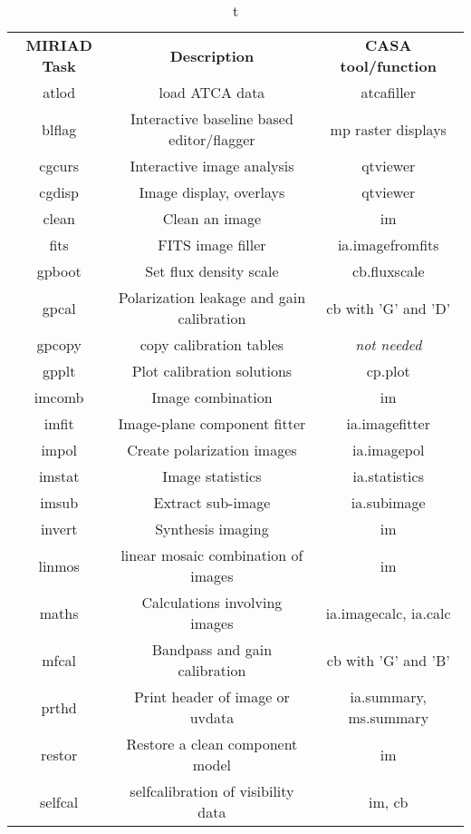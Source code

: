 \vspace{5mm}
\begin{table}[h!]
\caption[t]
        {\label{table:miriad}t}
\begin{center}
\begin{tabular}{|c|c|c|} \hline
{\bf MIRIAD Task} &  {\bf Description}     &  {\bf CASA tool/function}   \\
  atlod   &  load ATCA data                &  atcafiller   \\
  blflag  &  Interactive baseline based editor/flagger  &  mp raster displays\\
  cgcurs  &  Interactive image analysis    &  qtviewer \\ 
  cgdisp  &  Image display, overlays       &  qtviewer  \\
  clean   &  Clean an image                &  im   \\
  fits    &  FITS image filler             &  ia.imagefromfits \\  
  gpboot  &  Set flux density scale        &  cb.fluxscale   \\
  gpcal   &  Polarization leakage and gain calibration  &  cb with 'G' and 'D'  \\
  gpcopy  &  copy calibration tables       &   {\it not needed} \\
  gpplt   &  Plot calibration solutions    &  cp.plot  \\
  imcomb  &  Image combination             &  im   \\
  imfit   &  Image-plane component fitter  &  ia.imagefitter  \\
  impol   &  Create polarization images    &  ia.imagepol   \\
  imstat  &  Image statistics              &  ia.statistics  \\
  imsub   &  Extract sub-image             &  ia.subimage   \\
  invert  &  Synthesis imaging             &  im  \\
  linmos  &  linear mosaic combination of images  &  im   \\
  maths   &  Calculations involving images  &   ia.imagecalc, ia.calc \\ 
  mfcal   &  Bandpass and gain calibration  &  cb with 'G' and 'B'   \\
  prthd   &  Print header of image or uvdata  &  ia.summary, ms.summary  \\
  restor  &  Restore a clean component model  &  im  \\
  selfcal &  selfcalibration of visibility data  &  im, cb  \\

\end{tabular}
\end{center}
\end{table}
